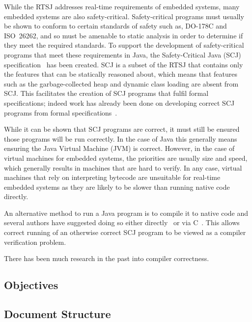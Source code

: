 \documentclass[a4paper,12pt]{article}
\begin{document}
While the RTSJ addresses real-time requirements of embedded systems, many embedded systems are also safety-critical.
Safety-critical programs must usually be shown to conform to certain standards of safety such as, \mbox{DO-178C} and ISO~26262, and so must be amenable to static analysis in order to determine if they meet the required standards.
To support the development of safety-critical programs that meet these requirements in Java, the Safety-Critical Java (SCJ) specification~\cite{locke2013} has been created.
SCJ is a subset of the RTSJ that contains only the features that can be statically reasoned about, which means that features such as the garbage-collected heap and dynamic class loading are absent from SCJ.
This facilitates the creation of SCJ programs that fulfil formal specifications; indeed work has already been done on developing correct SCJ programs from formal specifications~\cite{cavalcanti2011, cavalcanti2013}.

While it can be shown that SCJ programs are correct, it must still be ensured those programs will be run correctly.
In the case of Java this generally means ensuring the Java Virtual Machine (JVM) is correct.
However, in the case of virtual machines for embedded systems, the priorities are usually size and speed, which generally results in machines that are hard to verify.
In any case, virtual machines that rely on interpreting bytecode are unsuitable for real-time embedded systems as they are likely to be slower than running native code directly.

An alternative method to run a Java program is to compile it to native code and several authors have suggested doing so either directly~\cite{schultz2003} or via C~\cite{varma2004, korsholm2014}.
This allows correct running of an otherwise correct SCJ program to be viewed as a compiler verification problem.

There has been much research in the past into compiler correctness.


\subsection{Objectives}


\subsection{Document Structure}
\end{document}
